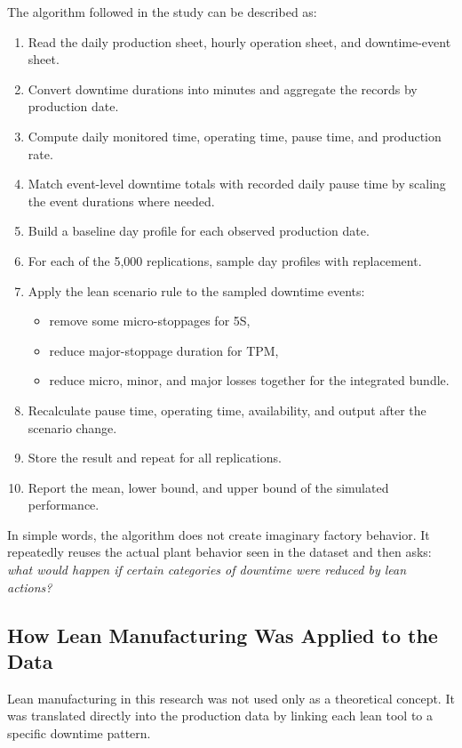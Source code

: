 \documentclass[12pt,a4paper]{article}
\begin{document}
The algorithm followed in the study can be described as:
\begin{enumerate}
    \item Read the daily production sheet, hourly operation sheet, and downtime-event sheet.
    \item Convert downtime durations into minutes and aggregate the records by production date.
    \item Compute daily monitored time, operating time, pause time, and production rate.
    \item Match event-level downtime totals with recorded daily pause time by scaling the event durations where needed.
    \item Build a baseline day profile for each observed production date.
    \item For each of the 5,000 replications, sample day profiles with replacement.
    \item Apply the lean scenario rule to the sampled downtime events:
    \begin{itemize}
        \item remove some micro-stoppages for 5S,
        \item reduce major-stoppage duration for TPM,
        \item reduce micro, minor, and major losses together for the integrated bundle.
    \end{itemize}
    \item Recalculate pause time, operating time, availability, and output after the scenario change.
    \item Store the result and repeat for all replications.
    \item Report the mean, lower bound, and upper bound of the simulated performance.
\end{enumerate}

In simple words, the algorithm does not create imaginary factory behavior. It repeatedly reuses the actual plant behavior seen in the dataset and then asks: \textit{what would happen if certain categories of downtime were reduced by lean actions?}

\subsection{How Lean Manufacturing Was Applied to the Data}
Lean manufacturing in this research was not used only as a theoretical concept. It was translated directly into the production data by linking each lean tool to a specific downtime pattern.
\end{document}
